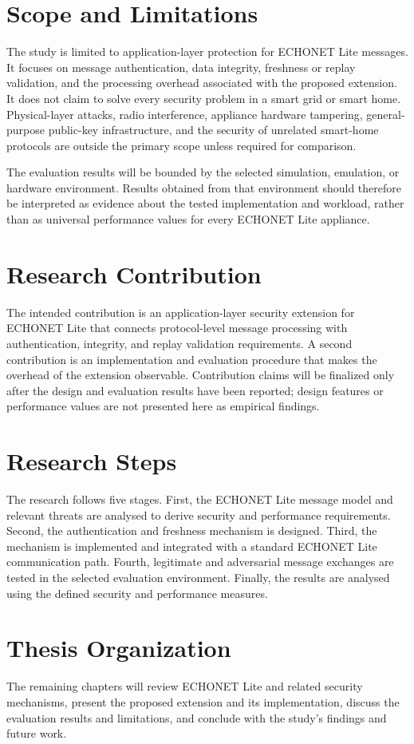 \section{Scope and Limitations}

The study is limited to application-layer protection for ECHONET Lite messages. It focuses on message authentication, data integrity, freshness or replay validation, and the processing overhead associated with the proposed extension. It does not claim to solve every security problem in a smart grid or smart home. Physical-layer attacks, radio interference, appliance hardware tampering, general-purpose public-key infrastructure, and the security of unrelated smart-home protocols are outside the primary scope unless required for comparison.

The evaluation results will be bounded by the selected simulation, emulation, or hardware environment. Results obtained from that environment should therefore be interpreted as evidence about the tested implementation and workload, rather than as universal performance values for every ECHONET Lite appliance.

\section{Research Contribution}

The intended contribution is an application-layer security extension for ECHONET Lite that connects protocol-level message processing with authentication, integrity, and replay validation requirements. A second contribution is an implementation and evaluation procedure that makes the overhead of the extension observable. Contribution claims will be finalized only after the design and evaluation results have been reported; design features or performance values are not presented here as empirical findings.

\section{Research Steps}

The research follows five stages. First, the ECHONET Lite message model and relevant threats are analysed to derive security and performance requirements. Second, the authentication and freshness mechanism is designed. Third, the mechanism is implemented and integrated with a standard ECHONET Lite communication path. Fourth, legitimate and adversarial message exchanges are tested in the selected evaluation environment. Finally, the results are analysed using the defined security and performance measures.

\section{Thesis Organization}

The remaining chapters will review ECHONET Lite and related security mechanisms, present the proposed extension and its implementation, discuss the evaluation results and limitations, and conclude with the study's findings and future work.


